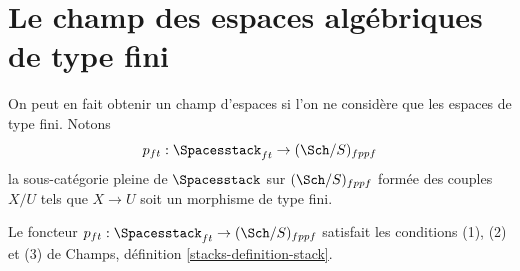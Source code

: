 \section{Le champ des espaces algébriques de type fini}
\label{section-stack-of-finite-type-spaces}


\noindent
On peut en fait obtenir un champ d'espaces
si l'on ne considère que les espaces de type fini.
Notons
$$
p_{ft} : \Spacesstack_{ft} \to (\Sch/S)_{fppf}
$$
la sous-catégorie pleine de $\Spacesstack$ sur $(\Sch/S)_{fppf}$
formée des couples $X/U$ tels que $X \to U$
soit un morphisme de type fini.

\begin{lemma}
\label{lemma-stack-of-finite-type-spaces}
Le foncteur
$p_{ft} : \Spacesstack_{ft} \to (\Sch/S)_{fppf}$
satisfait les conditions (1), (2) et (3) de
Champs, définition \ref{stacks-definition-stack}.
\end{lemma}

